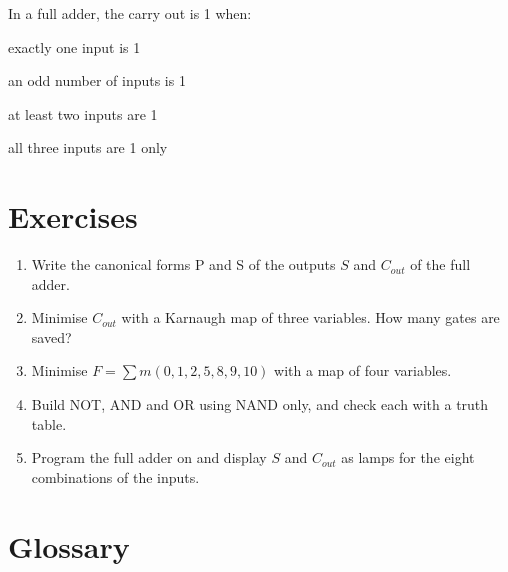 \begin{quiz}{In a full adder, the carry out is 1 when:}
\item exactly one input is 1
\item an odd number of inputs is 1
\item at least two inputs are 1
\item all three inputs are 1 only
\end{quiz}

\section{Exercises}

\begin{exercise}
\begin{enumerate}[nosep]
\item Write the canonical forms P and S of the outputs $S$ and $C_{out}$ of the
  full adder.
\item Minimise $C_{out}$ with a Karnaugh map of three variables. How many
  gates are saved?
\item Minimise $F=\sum m(0,1,2,5,8,9,10)$ with a map of four variables.
\item Build NOT, AND and OR using NAND only, and check each with a truth table.
\item Program the full adder on \prg and display $S$ and $C_{out}$ as lamps
  for the eight combinations of the inputs.
\end{enumerate}
\end{exercise}

\section{Glossary}

